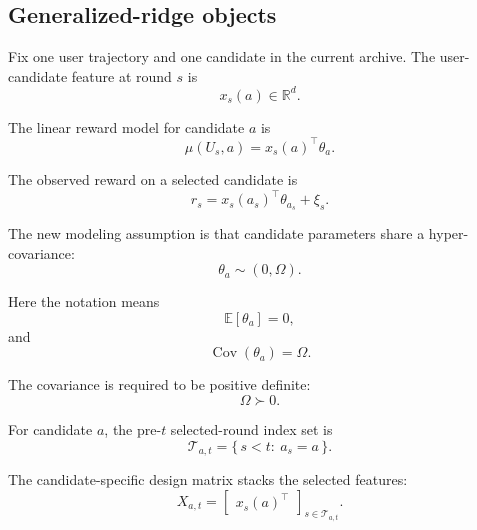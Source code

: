 \documentclass{article} %
\begin{document}
\subsection{Generalized-ridge objects}

Fix one user trajectory and one candidate in the current archive.  The user-candidate feature at round \(s\) is
\begin{equation}
\label{eq:hyper-feature}
x_s(a) \in \mathbb{R}^d .
\end{equation}

The linear reward model for candidate \(a\) is
\begin{equation}
\label{eq:hyper-linear-model-app}
\mu(U_s,a) = x_s(a)^\top \theta_a .
\end{equation}

The observed reward on a selected candidate is
\begin{equation}
\label{eq:hyper-reward}
r_s = x_s(a_s)^\top \theta_{a_s} + \xi_s .
\end{equation}

The new modeling assumption is that candidate parameters share a hyper-covariance:
\begin{equation}
\label{eq:hyper-random-effects}
\theta_a \sim (0,\Omega).
\end{equation}

Here the notation means
\begin{equation}
\label{eq:hyper-random-effects-mean}
\mathbb{E}[\theta_a] = 0,
\end{equation}
and
\begin{equation}
\label{eq:hyper-random-effects-cov}
\operatorname{Cov}(\theta_a)=\Omega .
\end{equation}

The covariance is required to be positive definite:
\begin{equation}
\label{eq:hyper-omega-pd}
\Omega \succ 0 .
\end{equation}

For candidate \(a\), the pre-\(t\) selected-round index set is
\begin{equation}
\label{eq:hyper-index-set}
\mathcal{T}_{a,t}=\{\,s<t:\ a_s=a\,\}.
\end{equation}

The candidate-specific design matrix stacks the selected features:
\begin{equation}
\label{eq:hyper-design-app}
X_{a,t}=
\begin{bmatrix}
x_s(a)^\top
\end{bmatrix}_{s\in\mathcal{T}_{a,t}} .
\end{equation}
\end{document}
